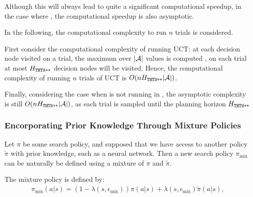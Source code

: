         Although this will always lead to quite a significant computational speedup, in the case where \mctsmode, the computational speedup is also asymptotic. 

        In the following, the computational complexity to run $n$ trials is considered.
        
        First consider the computational complexity of running UCT: at each decision node visited on a trial, the maximum over $|\mathcal{A}|$ values is computed , on each trial at most $H_{{\textnormal{\texttt{THTS++}}}}$ decision nodes will be visited. Hence, the computational complexity of running $n$ trials of UCT is $O(nH_{{\textnormal{\texttt{THTS++}}}}|\mathcal{A}|)$.


        Finally, considering the case when \thtspp\ewe is not running in \mctsmode, the asymptotic complexity is still $O(nH_{{\textnormal{\texttt{THTS++}}}}|\mathcal{A}|)$, as each trial is sampled until the planning horizon $H_{{\textnormal{\texttt{THTS++}}}}$ 




        






        \subsubsection{Encorporating Prior Knowledge Through Mixture Policies}

        Let $\pi$ be some \thtspp\ewe search policy, and supposed that we have access to another policy $\tilde{\pi}$ with prior knowledge, such as a neural network. Then a new search policy $\pi_{\text{mix}}$ can be naturally be defined using a mixture of $\pi$ and $\tilde{\pi}$.


        The mixture policy is defined by:
        \begin{align}
            \pi_{\text{mix}}(a|s) = 
                (1-\lambda(s,\epsilon_{\text{mix}})) \pi(a|s) 
                + \lambda(s,\epsilon_{\text{mix}}) \tilde{\pi}(a|s),
        \end{align}

